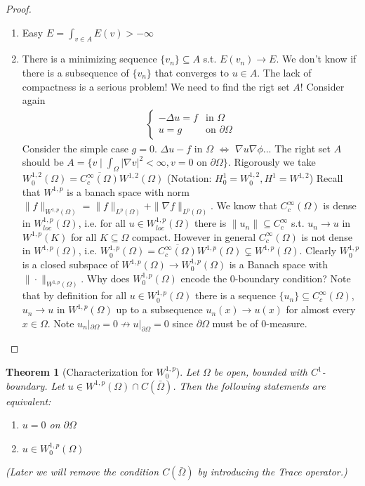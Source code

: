 \documentclass{report}
\theoremstyle{tommy}
\newtheorem{thm}[defn]{Theorem}
\begin{document}
\begin{proof}
    \begin{enumerate}[label=Step \arabic*:]
      \item Easy \(E = \int_{v \in A} E(v) > - \infty\)
      \item There is a minimizing sequence \(\{v_n\} \subseteq A\) s.t. \(E(v_n) \to E\). We don't know if there is a subsequence of \(\{v_n\}\) that converges to \(u \in A\). The lack of compactness is a serious problem! We need to find the rigt set \(A\)! Consider again \begin{align*}
        \begin{cases}
          - \Delta u = f & \text{in } \Omega \\ u = g &\text{on } \partial \Omega
        \end{cases}
      \end{align*}
      Consider the simple case \(g = 0\). 
      \(\Delta u -f \) in \(\Omega\) \(\Leftrightarrow\) \(\nabla u \nabla \phi\)...
      The right set \(A\) should be \(A = \{v \mid \int_\Omega |\nabla v|^2 < \infty, v = 0 \text{ on } \partial \Omega\}.\) Rigorously we take \(W_0^{1,2}(\Omega) = \overline{C_c^\infty(\Omega)}W^{1,2}(\Omega)\) (Notation: \(H_0^1 = W_0^{1,2}, H^1 = W^{1,2}\)) Recall that \(W^{1,p}\) is a banach space with norm \(\|f\|_{W^{1,p}(\Omega)} = \|f\|_{L^p(\Omega)} + \|\nabla f\|_{L^p(\Omega)}\). We know that \(C_c^\infty(\Omega)\) is dense in \(W_{loc}^{1,p}(\Omega)\), i.e. for all \(u \in W^{1,p}_{loc}(\Omega)\) there is \(\|u_n\| \subseteq C_c^\infty\) s.t. \(u_n \to u\) in \(W^{1,p}(K)\) for all \(K \subseteq \Omega\) compact. However in general \(C_c^\infty(\Omega)\) is not dense in \(W^{1,p}(\Omega)\), i.e. \(W_0^{1,p}(\Omega) = \overline{C_c^\infty(\Omega)}W^{1,p}(\Omega) \subsetneq W^{1,p}(\Omega)\). Clearly \(W_0^{1,p}\) is a closed subspace of \(W^{1,p}(\Omega) \to W_0^{1,p}(\Omega)\)  is a Banach space with \(\|\cdot\|_{W^{1,p}(\Omega)}\). Why does \(W_0^{1,p}(\Omega)\) encode the \(0\)-boundary condition? Note that by definition for all \(u \in W_0^{1,p}(\Omega)\) there is a sequence \(\{u_n\} \subseteq C_c^\infty(\Omega)\), \(u_n \to u\) in \(W^{1,p}(\Omega)\) up to a subsequence \(u_n(x) \to u(x)\) for almost every \(x \in \Omega\). Note \(u_n|_{\partial \Omega} = 0 \nrightarrow u|_{\partial \Omega} = 0\) since \(\partial \Omega\) must be of 0-measure. \qedhere
    \end{enumerate}
  \end{proof}

  \begin{thm}[Characterization for \(W_0^{1,p}\)]\label{characterization-for-w01p}
    Let \(\Omega\) be open, bounded with \(C^1\)-boundary. Let \(u \in W^{1,p}(\Omega)\cap C(\bar \Omega)\). Then the following statements are equivalent:
    \begin{enumerate}[label=\alph*)]
      \item \(u = 0\) on \(\partial \Omega\)
      \item \(u \in W_0^{1,p}(\Omega)\)
    \end{enumerate}
    (Later we will remove the condition \(C(\bar \Omega)\) by introducing the \emph{Trace operator}.)
  \end{thm}
\end{document}
